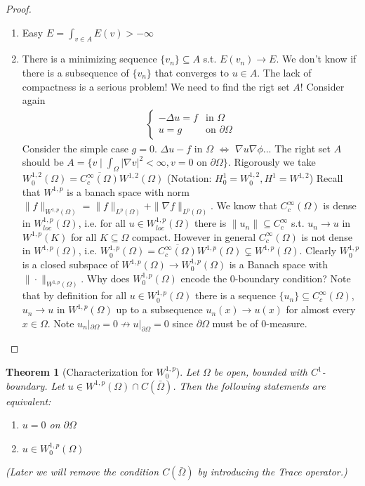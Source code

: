 \documentclass{report}
\theoremstyle{tommy}
\newtheorem{thm}[defn]{Theorem}
\begin{document}
\begin{proof}
    \begin{enumerate}[label=Step \arabic*:]
      \item Easy \(E = \int_{v \in A} E(v) > - \infty\)
      \item There is a minimizing sequence \(\{v_n\} \subseteq A\) s.t. \(E(v_n) \to E\). We don't know if there is a subsequence of \(\{v_n\}\) that converges to \(u \in A\). The lack of compactness is a serious problem! We need to find the rigt set \(A\)! Consider again \begin{align*}
        \begin{cases}
          - \Delta u = f & \text{in } \Omega \\ u = g &\text{on } \partial \Omega
        \end{cases}
      \end{align*}
      Consider the simple case \(g = 0\). 
      \(\Delta u -f \) in \(\Omega\) \(\Leftrightarrow\) \(\nabla u \nabla \phi\)...
      The right set \(A\) should be \(A = \{v \mid \int_\Omega |\nabla v|^2 < \infty, v = 0 \text{ on } \partial \Omega\}.\) Rigorously we take \(W_0^{1,2}(\Omega) = \overline{C_c^\infty(\Omega)}W^{1,2}(\Omega)\) (Notation: \(H_0^1 = W_0^{1,2}, H^1 = W^{1,2}\)) Recall that \(W^{1,p}\) is a banach space with norm \(\|f\|_{W^{1,p}(\Omega)} = \|f\|_{L^p(\Omega)} + \|\nabla f\|_{L^p(\Omega)}\). We know that \(C_c^\infty(\Omega)\) is dense in \(W_{loc}^{1,p}(\Omega)\), i.e. for all \(u \in W^{1,p}_{loc}(\Omega)\) there is \(\|u_n\| \subseteq C_c^\infty\) s.t. \(u_n \to u\) in \(W^{1,p}(K)\) for all \(K \subseteq \Omega\) compact. However in general \(C_c^\infty(\Omega)\) is not dense in \(W^{1,p}(\Omega)\), i.e. \(W_0^{1,p}(\Omega) = \overline{C_c^\infty(\Omega)}W^{1,p}(\Omega) \subsetneq W^{1,p}(\Omega)\). Clearly \(W_0^{1,p}\) is a closed subspace of \(W^{1,p}(\Omega) \to W_0^{1,p}(\Omega)\)  is a Banach space with \(\|\cdot\|_{W^{1,p}(\Omega)}\). Why does \(W_0^{1,p}(\Omega)\) encode the \(0\)-boundary condition? Note that by definition for all \(u \in W_0^{1,p}(\Omega)\) there is a sequence \(\{u_n\} \subseteq C_c^\infty(\Omega)\), \(u_n \to u\) in \(W^{1,p}(\Omega)\) up to a subsequence \(u_n(x) \to u(x)\) for almost every \(x \in \Omega\). Note \(u_n|_{\partial \Omega} = 0 \nrightarrow u|_{\partial \Omega} = 0\) since \(\partial \Omega\) must be of 0-measure. \qedhere
    \end{enumerate}
  \end{proof}

  \begin{thm}[Characterization for \(W_0^{1,p}\)]\label{characterization-for-w01p}
    Let \(\Omega\) be open, bounded with \(C^1\)-boundary. Let \(u \in W^{1,p}(\Omega)\cap C(\bar \Omega)\). Then the following statements are equivalent:
    \begin{enumerate}[label=\alph*)]
      \item \(u = 0\) on \(\partial \Omega\)
      \item \(u \in W_0^{1,p}(\Omega)\)
    \end{enumerate}
    (Later we will remove the condition \(C(\bar \Omega)\) by introducing the \emph{Trace operator}.)
  \end{thm}
\end{document}
